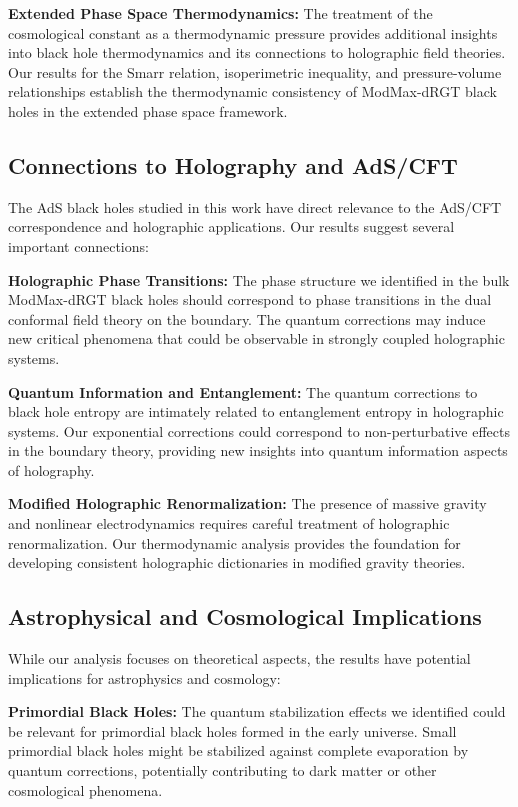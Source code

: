 \documentclass[12pt]{article}
\begin{document}
\textbf{Extended Phase Space Thermodynamics:} The treatment of the cosmological constant as a thermodynamic pressure provides additional insights into black hole thermodynamics and its connections to holographic field theories. Our results for the Smarr relation, isoperimetric inequality, and pressure-volume relationships establish the thermodynamic consistency of ModMax-dRGT black holes in the extended phase space framework.

\subsection{Connections to Holography and AdS/CFT}

The AdS black holes studied in this work have direct relevance to the AdS/CFT correspondence and holographic applications. Our results suggest several important connections:

\textbf{Holographic Phase Transitions:} The phase structure we identified in the bulk ModMax-dRGT black holes should correspond to phase transitions in the dual conformal field theory on the boundary. The quantum corrections may induce new critical phenomena that could be observable in strongly coupled holographic systems.

\textbf{Quantum Information and Entanglement:} The quantum corrections to black hole entropy are intimately related to entanglement entropy in holographic systems. Our exponential corrections could correspond to non-perturbative effects in the boundary theory, providing new insights into quantum information aspects of holography.

\textbf{Modified Holographic Renormalization:} The presence of massive gravity and nonlinear electrodynamics requires careful treatment of holographic renormalization. Our thermodynamic analysis provides the foundation for developing consistent holographic dictionaries in modified gravity theories.

\subsection{Astrophysical and Cosmological Implications}

While our analysis focuses on theoretical aspects, the results have potential implications for astrophysics and cosmology:

\textbf{Primordial Black Holes:} The quantum stabilization effects we identified could be relevant for primordial black holes formed in the early universe. Small primordial black holes might be stabilized against complete evaporation by quantum corrections, potentially contributing to dark matter or other cosmological phenomena.
\end{document}
